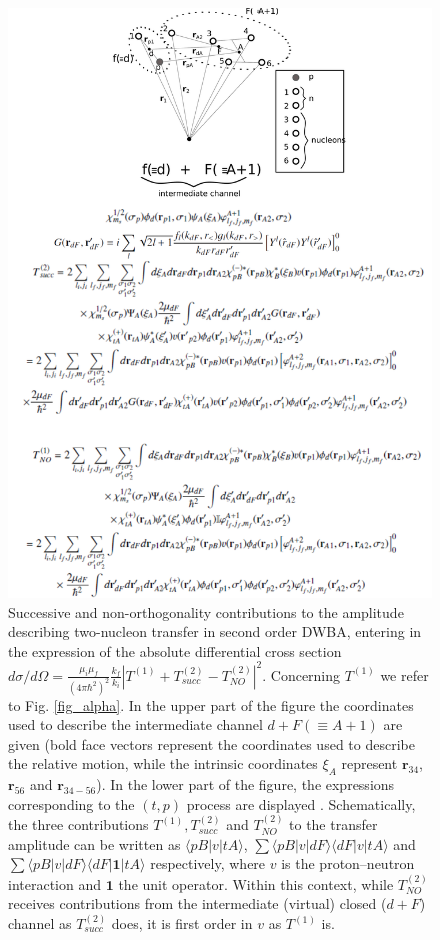 \begin{figure}
\centerline{\includegraphics*[width=\textwidth,angle=0]{nutshell/figs/fig_beta.pdf}}
\caption{Successive and non-orthogonality contributions to the  amplitude describing two-nucleon transfer in second order DWBA, entering in the expression of the absolute differential cross section $d\sigma/d\Omega=\tfrac{\mu_i\mu_f}{(4\pi\hbar^2)^2}\tfrac{k_f}{k_i}\left|T^{(1)}+T_{succ}^{(2)}-T^{(2)}_{NO}\right|^2$. Concerning $T^{(1)}$ we refer to Fig. \ref{fig_alpha}. In the upper part of the figure the coordinates used to describe the intermediate channel $d+F(\equiv A+1)$ are given (bold face vectors represent the coordinates used to describe the relative motion, while the intrinsic coordinates $\xi_A$ represent $\mathbf r_{34}$, $\mathbf r_{56}$ and $\mathbf r_{34-56}$). In the lower part of the figure, the  expressions corresponding to the $(t,p)$ process are displayed \citep{Potel:13b}. Schematically, the three contributions $T^{(1)}, T^{(2)}_{succ}$ and $T^{(2)}_{NO}$ to the transfer amplitude can be written as $\langle pB|v|tA\rangle$, $\sum \langle pB|v|dF\rangle\langle dF|v|tA\rangle$ and $\sum \langle pB|v|dF\rangle\langle dF| \mathbf{1}|tA\rangle$ respectively, where $v$ is the proton--neutron interaction and $\mathbf 1$ the unit operator. Within this context, while $T^{(2)}_{NO}$ receives contributions from the intermediate (virtual) closed ($d+F$) channel as $T^{(2)}_{succ}$ does, it is first order in $v$ as $T^{(1)}$ is.}\label{fig_beta}
\end{figure}
